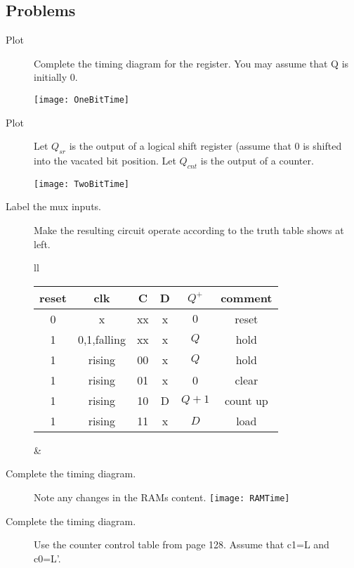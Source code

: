 \subsection{Problems}
\begin{description}

\item[Plot] Complete the timing diagram for the register.
You may assume that Q is initially 0.

\texttt{[image: OneBitTime]}

\item[Plot] Let 
$Q_{sr}$ is the output of a logical shift register
(assume that 0 is shifted into the vacated bit position.
Let $Q_{cnt}$ is the output of a counter.

\texttt{[image: TwoBitTime]}
\pagebreak

\item[Label the mux inputs.]
Make the resulting circuit operate according to the
truth table shows at left.

\begin{tabular}{ll} 
\begin{tabular}{c|c|c|c||c||c}
reset & clk          & C  & D   & $Q^+$  & comment     \\ \hline
0     & x            & xx & x   & $0$    & reset       \\ \hline
1     & 0,1,falling  & xx & x   & $Q$    & hold        \\ \hline
1     & rising       & 00 & x   & $Q$    & hold        \\ \hline
1     & rising       & 01 & x   & 0      & clear       \\ \hline
1     & rising       & 10 & D   & $Q+1$  & count up    \\ \hline
1     & rising       & 11 & x   & $D$    & load        \\ 
\end{tabular}
&
\end{tabular}

\vspace{1.0in}

\item[Complete the timing diagram.]  Note any changes in
the RAMs content.
\texttt{[image: RAMTime]}

\pagebreak

\item[Complete the timing diagram.]  Use the counter control table 
from page 128.  Assume that c1=L and c0=L'.


\end{description}
